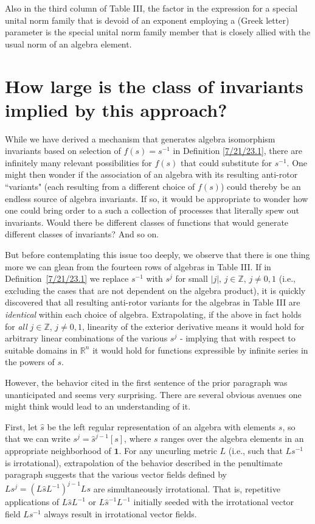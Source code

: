 \documentclass{amsart}
\theoremstyle{definition}
\numberwithin{theorem}{section}
\numberwithin{equation}{section}
\begin{document}
Also in the third column of Table III, the factor in the expression for a special unital norm family that is devoid of an exponent employing a (Greek letter) parameter is the special unital norm family member that is closely allied with the usual norm of an algebra element.



 
   

\section{How large is the class of invariants implied by this approach?}
While we have derived a mechanism that generates algebra isomorphism invariants based on selection of $f(s)=s^{-1}$ in Definition  
\ref{7/21/23.1}, there are infinitely many relevant possibilities for $f(s)$ that could substitute for $s^{-1}$.    One might then wonder if the association of an algebra with its resulting anti-rotor ``variants" (each resulting from a different choice of $f(s)$) could thereby be an endless source of algebra invariants.  If so, it would be appropriate to wonder how one could bring order to a such a collection of processes that literally spew out invariants.  Would there be different classes of functions that would generate different classes of invariants?  And so on.  

But before contemplating this issue too deeply, we observe that
there is one thing more we can glean from the fourteen rows of algebras in Table III.  If in \mbox{Definition \ref{7/21/23.1}} we replace $s^{-1}$ with $s^j$ for small $|j|$, $j\in\mathbb{Z}$, $j\ne 0,1$ (i.e., excluding the cases that are not dependent on the algebra product), it is quickly discovered that all resulting anti-rotor variants for the algebras in Table III are {\it identical} within each choice of algebra.  Extrapolating, if the above in fact holds for {\it all} $j\in\mathbb{Z}$, $j\ne 0,1$, linearity of the exterior derivative means it would hold for arbitrary linear combinations of the various $s^j$ - implying that with respect to suitable domains in $\mathbb{R}^n$ it would hold for functions expressible by infinite series in the powers of $s$. 

However, the behavior cited in the first sentence of the prior paragraph was unanticipated and seems very surprising. There are several obvious avenues one might think would lead to an understanding of it.

First, let $\hat{s}$ be the left regular representation of an algebra with elements $s$, so that we can write $s^j = \hat{s}^{j-1}[s]$, where $s$ ranges over the algebra elements in an appropriate neighborhood of $\mathbf{1}$. For any uncurling metric $L$ (i.e., such that $Ls^{-1}$ is irrotational), extrapolation of the behavior described in the penultimate paragraph suggests that the various vector fields defined by $Ls^j = (L\hat{s}L^{-1})^{j-1}Ls$ are simultaneously irrotational. That is, repetitive applications of $L\hat{s}L^{-1}$ or $L\hat{s}^{-1}L^{-1}$ initially seeded with the irrotational vector field $Ls^{-1}$ always result in irrotational vector fields.  
\end{document}
